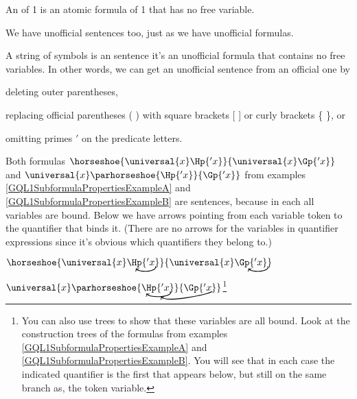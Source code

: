 \begin{majorILnc}{}
An   of \GQL{}1 is an atomic formula of \GQL{}1 that has no free variable.
\end{majorILnc}
\noindent{}We have unofficial sentences too, just as we have unofficial formulas.
\begin{majorILnc}{}
A string of symbols is an  sentence \Iff it's an unofficial formula that contains no free variables. In other words, we can get an unofficial sentence from an official one by
\begin{cenumerate}
\item deleting outer parentheses,
\item replacing official parentheses ( ) with square brackets [ ] or curly brackets \{ \}, or
\item omitting primes $'$ on the predicate letters.
\end{cenumerate}
\end{majorILnc}
\begin{majorILnc}{}
Both formulas $\horseshoe{\universal{\variable{x}}\Hp{'\variable{x}}}{\universal{\variable{x}}\Gp{'\variable{x}}}$ and $\universal{\variable{x}}\parhorseshoe{\Hp{'\variable{x}}}{\Gp{'\variable{x}}}$ from examples \ref{GQL1SubformulaPropertiesExampleA} and \ref{GQL1SubformulaPropertiesExampleB} are sentences, because in each all variables are bound.
Below we have arrows pointing from each variable token to the quantifier that binds it.  (There are no arrows for the variables in quantifier expressions since it's obvious which quantifiers they belong to.)
\begin{cenumerate}
\item $\horseshoe{\universal{\variable{x}}\Hp{'\variable{x}}\NextLineRef[black, distance=6, out=-70, in=-50]}{\universal{\variable{x}}\Gp{'\variable{x}}}\NextLineRef[black, distance=6, out=-70, in=-50]$
\item $\universal{\variable{x}}\parhorseshoe{\Hp{'\variable{x}}\NextLineRefJ[black, out=-50, in=-50]}{\Gp{'\variable{x}}\NextLineRefB[black, distance=9, out=205, in=315]}$\footnote{
	You can also use trees to show that these variables are all bound. Look at the construction trees of the formulas from examples \ref{GQL1SubformulaPropertiesExampleA} and \ref{GQL1SubformulaPropertiesExampleB}. You will see that in each case the indicated quantifier is the first that appears below, but still on the same branch as, the token variable.
}
\end{cenumerate}

\end{majorILnc}
